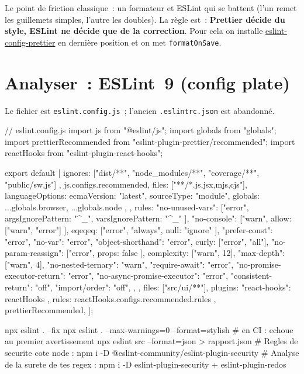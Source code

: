 \documentclass[12pt,a4paper,twoside,openright]{book}
\newcommand{\fichier}[1]{\texttt{\color{pathgreen}#1}}
\newcommand{\link}[2]{\href{#2}{#1}}
\begin{document}
\begin{note}
Le point de friction classique~: un formateur et ESLint qui se battent (l'un remet les guillemets
simples, l'autre les doubles). La r\`egle est~: \textbf{Prettier d\'ecide du style, ESLint ne d\'ecide
que de la correction}. Pour cela on installe
\link{eslint-config-prettier}{https://github.com/prettier/eslint-config-prettier} en derni\`ere
position et on met \verb|formatOnSave|.
\end{note}

\section{Analyser~: ESLint~9 (config plate)}

Le fichier est \fichier{eslint.config.js}~; l'ancien \fichier{.eslintrc.json} est abandonn\'e.

\begin{codejs}
// eslint.config.js
import js from "@eslint/js";
import globals from "globals";
import prettierRecommended from "eslint-plugin-prettier/recommended";
import reactHooks from "eslint-plugin-react-hooks";

export default [
  { ignores: ["dist/**", "node_modules/**", "coverage/**", "public/sw.js"] },
  js.configs.recommended,
  {
    files: ["**/*.{js,jsx,mjs,cjs}"],
    languageOptions: {
      ecmaVersion: "latest",
      sourceType: "module",
      globals: { ...globals.browser, ...globals.node },
    },
    rules: {
      "no-unused-vars": ["error", { argsIgnorePattern: "^_", varsIgnorePattern: "^_" }],
      "no-console": ["warn", { allow: ["warn", "error"] }],
      eqeqeq: ["error", "always", { null: "ignore" }],
      "prefer-const": "error",
      "no-var": "error",
      "object-shorthand": "error",
      curly: ["error", "all"],
      "no-param-reassign": ["error", { props: false }],
      complexity: ["warn", 12],
      "max-depth": ["warn", 4],
      "no-nested-ternary": "warn",
      "require-await": "error",
      "no-promise-executor-return": "error",
      "no-async-promise-executor": "error",
      "consistent-return": "off",
      "import/order": "off",
    },
  },
  { files: ["src/ui/**"], plugins: { "react-hooks": reactHooks }, rules: reactHooks.configs.recommended.rules },
  prettierRecommended,
];
\end{codejs}

\begin{terminal}
npx eslint . --fix
npx eslint . --max-warnings=0 --format=stylish        # en CI : echoue au premier avertissement
npx eslint src --format=json > rapport.json
# Regles de securite cote node : npm i -D @eslint-community/eslint-plugin-security
# Analyse de la surete de tes regex : npm i -D eslint-plugin-security + eslint-plugin-redos
\end{terminal}
\end{document}
